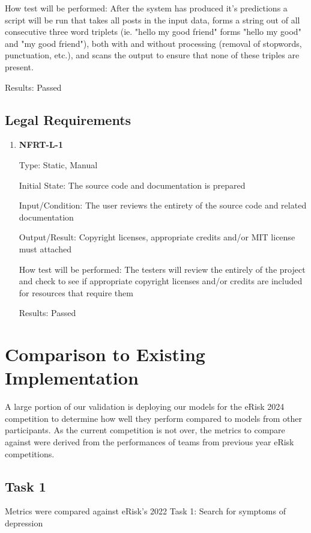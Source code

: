 \documentclass[12pt, titlepage]{article}
\begin{document}
\begin{enumerate}
\begin{enumerate}
How test will be performed: After the system has produced it's predictions a script will be run that takes all posts in the input data, forms a string out of all consecutive three word triplets (ie. "hello my good friend" forms "hello my good" and "my good friend"), both with and without processing (removal of stopwords, punctuation, etc.), and scans the output to ensure that none of these triples are present.


Results: Passed
 \end{enumerate}


\subsection{Legal Requirements}


\begin{enumerate}


\item \textbf{NFRT-L-1}


Type: Static, Manual
        
Initial State: The source code and documentation is prepared
        
Input/Condition: The user reviews the entirety of the source code and related documentation
        
Output/Result: Copyright licenses, appropriate credits and/or MIT license must attached
        
How test will be performed: The testers will review the entirely of the project and check to see if appropriate copyright licenses and/or credits are included for resources that require them


Results: Passed


\end{enumerate}


 \section{Comparison to Existing Implementation}


A large portion of our validation is deploying our models for the eRisk 2024 competition to determine how well they perform compared to models from other participants. As the current competition is not over, the metrics to compare against were derived from the performances of teams from previous year eRisk competitions.


\subsection{Task 1}
Metrics were compared against eRisk's 2022 Task 1: Search for symptoms of depression



\end{enumerate}
\end{document}
